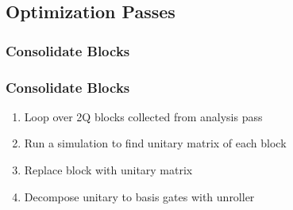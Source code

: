 \documentclass[aspectratio=169,11pt,hyperref={colorlinks=true}]{beamer}
\begin{document}
\subsection{Optimization Passes}
\subsubsection{Consolidate Blocks}
\begin{frame}
    \frametitle{Consolidate Blocks}
    \begin{enumerate}
        \item Loop over 2Q blocks collected from analysis pass
        \item Run a simulation to find unitary matrix of each block
        \item Replace block with unitary matrix
        \item Decompose unitary to basis gates with unroller
    \end{enumerate}
    \begin{center}
    \vspace{3em}
\end{center}
\end{frame}
\end{document}
